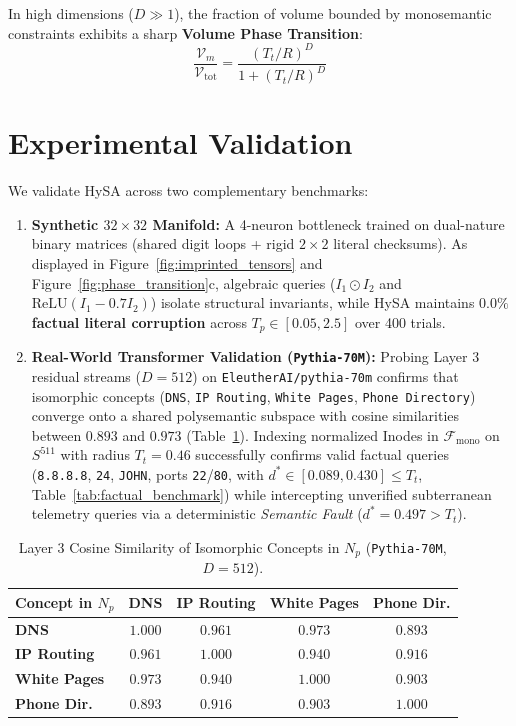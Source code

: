 \documentclass[10pt,twocolumn]{article}
\theoremstyle{definition}
\begin{document}
In high dimensions ($D \gg 1$), the fraction of volume bounded by monosemantic constraints exhibits a sharp \textbf{Volume Phase Transition}:
\begin{equation}
    \frac{\mathcal{V}_m}{\mathcal{V}_{\mathrm{tot}}} = \frac{(T_t / R)^D}{1 + (T_t / R)^D}
\end{equation}

\section{Experimental Validation}
We validate HySA across two complementary benchmarks:
\begin{enumerate}[leftmargin=*, itemsep=1.5pt, topsep=2pt]
    \item \textbf{Synthetic $32 \times 32$ Manifold:} A 4-neuron bottleneck trained on dual-nature binary matrices (shared digit loops + rigid $2\times2$ literal checksums). As displayed in Figure~\ref{fig:imprinted_tensors} and Figure~\ref{fig:phase_transition}c, algebraic queries ($I_1 \odot I_2$ and $\mathrm{ReLU}(I_1 - 0.7 I_2)$) isolate structural invariants, while HySA maintains \textbf{$0.0\%$ factual literal corruption} across $T_p \in [0.05, 2.5]$ over 400 trials.
    \item \textbf{Real-World Transformer Validation (\texttt{Pythia-70M}):} Probing Layer 3 residual streams ($D=512$) on \texttt{EleutherAI/pythia-70m} confirms that isomorphic concepts (\texttt{DNS}, \texttt{IP Routing}, \texttt{White Pages}, \texttt{Phone Directory}) converge onto a shared polysemantic subspace with cosine similarities between $\mathbf{0.893}$ and $\mathbf{0.973}$ (Table~\ref{tab:pythia}). Indexing normalized Inodes in $\mathcal{F}_{\mathrm{mono}}$ on $S^{511}$ with radius $T_t = 0.46$ successfully confirms valid factual queries (\texttt{8.8.8.8}, \texttt{24}, \texttt{JOHN}, ports \texttt{22}/\texttt{80}, with $d^* \in [0.089, 0.430] \le T_t$, Table~\ref{tab:factual_benchmark}) while intercepting unverified subterranean telemetry queries via a deterministic \textit{Semantic Fault} ($d^* = 0.497 > T_t$).
\end{enumerate}

\begin{table}[t]
\centering
\caption{Layer 3 Cosine Similarity of Isomorphic Concepts in $N_p$ (\texttt{Pythia-70M}, $D=512$).}
\label{tab:pythia}
\vspace{0.1cm}
\scriptsize
\setlength{\tabcolsep}{2.5pt}
\begin{tabular}{@{}lcccc@{}}
\toprule
\textbf{Concept in $N_p$} & \textbf{DNS} & \textbf{IP Routing} & \textbf{White Pages} & \textbf{Phone Dir.} \\ \midrule
\textbf{DNS} & $1.000$ & $0.961$ & $0.973$ & $0.893$ \\
\textbf{IP Routing} & $0.961$ & $1.000$ & $0.940$ & $0.916$ \\
\textbf{White Pages} & $0.973$ & $0.940$ & $1.000$ & $0.903$ \\
\textbf{Phone Dir.} & $0.893$ & $0.916$ & $0.903$ & $1.000$ \\ \bottomrule
\end{tabular}
\end{table}
\end{document}
